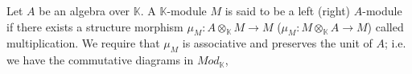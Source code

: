 \documentclass[../thesis.tex]{subfiles}
\begin{document}
                \begin{definition}[Modules]
                    Let $A$ be an algebra over $\mathbb{K}$. A $\mathbb{K}$-module $M$ is said to be a left (right) $A$-module if there exists a structure morphism $\mu_M : A\otimes_{\mathbb{K}}M \rightarrow M$ ($\mu_M : M\otimes_{\mathbb{K}}A \rightarrow M$) called multiplication. We require that $\mu_M$ is associative and preserves the unit of $A$; i.e. we have the commutative diagrams in $Mod_\mathbb{K}$,
                    \begin{center}
                    \end{center}
                            


                            

\end{definition}
\end{document}
